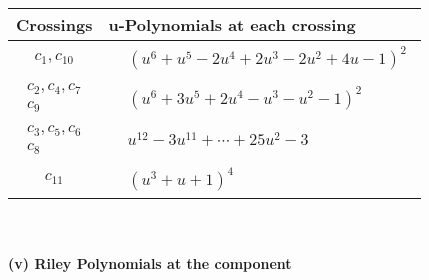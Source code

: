 \documentclass[1p]{elsarticle_modified}
\theoremstyle{definition}
\begin{document}
\begin{tabular}{m{50pt}|m{274pt}}
Crossings & \hspace{64pt}u-Polynomials at each crossing \\
\hline $$\begin{aligned}c_{1},c_{10}\end{aligned}$$&$\begin{aligned}
&(u^6+u^5-2 u^4+2 u^3-2 u^2+4 u-1)^2
\end{aligned}$\\
\hline $$\begin{aligned}c_{2},c_{4},c_{7}\\c_{9}\end{aligned}$$&$\begin{aligned}
&(u^6+3 u^5+2 u^4- u^3- u^2-1)^2
\end{aligned}$\\
\hline $$\begin{aligned}c_{3},c_{5},c_{6}\\c_{8}\end{aligned}$$&$\begin{aligned}
&u^{12}-3 u^{11}+\cdots+25 u^2-3
\end{aligned}$\\
\hline $$\begin{aligned}c_{11}\end{aligned}$$&$\begin{aligned}
&(u^3+u+1)^4
\end{aligned}$\\
\hline
\end{tabular}\\~\\
\newpage\renewcommand{\arraystretch}{1}
\flushleft \textbf{(v) Riley Polynomials at the component}\newline \\
\end{document}
